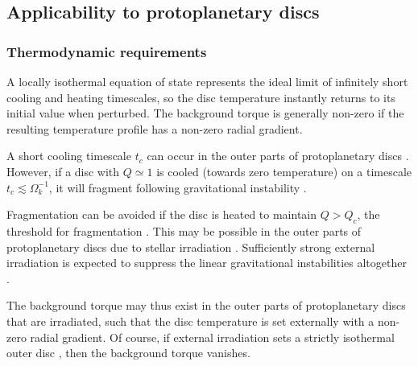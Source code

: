 {\bf
  \subsection{Applicability to protoplanetary discs}
  
  \subsubsection{Thermodynamic requirements}  

  A locally isothermal equation of state represents the ideal limit
  of infinitely short cooling and heating timescales, so the 
  disc temperature instantly returns to its initial value when 
  perturbed. The background torque is generally non-zero if the 
  resulting temperature profile has a non-zero radial gradient.  
  
  A short cooling timescale $t_c$ can occur in the outer
  parts of protoplanetary discs 
  \citep{rafikov05,clarke09,rice09,cossins10b,tsukamoto15}.  %
  However, if a disc with $Q\simeq 1$ is cooled (towards zero
  temperature) on a timescale $t_c\lesssim\Omega_k^{-1}$, it will
  fragment following gravitational instability
  \citep{gammie01,rice05,paardekooper12}.  
  
  Fragmentation can be avoided if the disc is heated to maintain 
  $Q>Q_c$, the threshold for fragmentation \citep[$Q_c\simeq
  1.4$ for isothermal discs,][]{mayer04}. This may be 
  possible in the outer parts of protoplanetary discs due to
  stellar irradiation \citep{rafikov09,kratter11,zhu12}. Sufficiently strong
  external irradiation is expected to suppress the linear gravitational
  instabilities altogether \citep{rice11}.  

  The background torque may thus exist in the outer
  parts of protoplanetary discs that are irradiated, such
  that the disc temperature is set externally with a non-zero radial
  gradient. Of course, if external irradiation sets a strictly
  isothermal outer disc \citep[e.g.][]{boley09}, then the background
  torque vanishes.      

}

